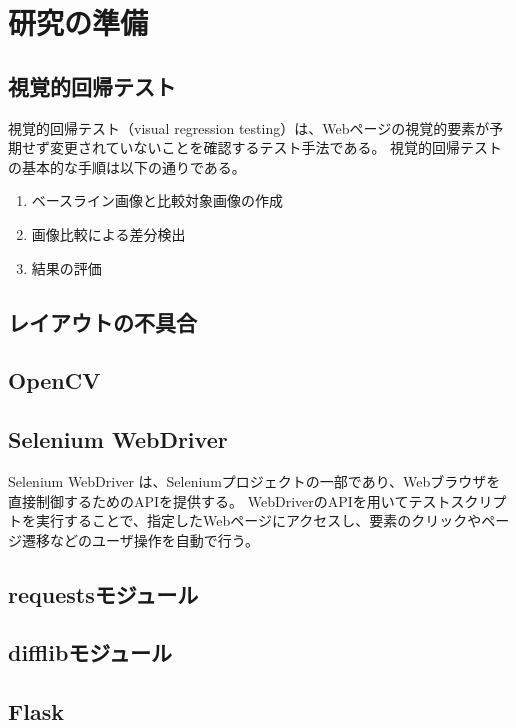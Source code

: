 \chapter{研究の準備}\label{cha:Preparation}

\section{視覚的回帰テスト}\label{sec:vrt}
視覚的回帰テスト（visual regression testing）は、Webページの視覚的要素が予期せず変更されていないことを確認するテスト手法である。
視覚的回帰テストの基本的な手順は以下の通りである。
\begin{enumerate}
    \setlength{\itemsep}{0pt}
          \setlength{\parsep}{0pt}
    \item ベースライン画像と比較対象画像の作成
    \item 画像比較による差分検出
    \item 結果の評価
\end{enumerate}
\section{レイアウトの不具合}\label{sec:layout effect}

\section{OpenCV}\label{sec:OpenCV}

\section{Selenium WebDriver}\label{sec:Selenium_WebDriver}
Selenium WebDriver は、Seleniumプロジェクトの一部であり、Webブラウザを直接制御するためのAPIを提供する。
WebDriverのAPIを用いてテストスクリプトを実行することで、指定したWebページにアクセスし、要素のクリックやページ遷移などのユーザ操作を自動で行う。
\section{requestsモジュール}\label{sec:requests}

\section{difflibモジュール}\label{sec:difflib}

\section{Flask}\label{sec:Flask}
